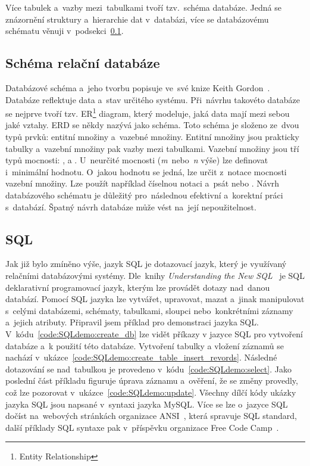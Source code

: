 Více tabulek a~vazby mezi~tabulkami tvoří tzv.~schéma databáze. Jedná se znázornění struktury a~hierarchie dat
v~databázi, více se databázovému schématu věnuji v~podsekci~\ref{subsection:schema_relacni_databaze}.

\subsection{Schéma relační databáze}
\label{subsection:schema_relacni_databaze}
Databázové schéma a~jeho tvorbu  popisuje ve~své knize Keith Gordon~\cite{ModellingBusinessInformationEntityRelationship}.
Databáze reflektuje data a~stav určitého systému. Při~návrhu takovéto databáze se nejprve tvoří tzv. ER\footnote{Entity Relationship} diagram, který modeluje, jaká data mají mezi sebou jaké vztahy. ERD se někdy nazývá
jako schéma. Toto schéma je složeno ze~dvou typů prvků: entitní množiny a~vazebné množiny. Entitní množiny jsou
prakticky tabulky a~vazební množiny pak vazby mezi tabulkami.
Vazební množiny jsou tří typů mocnosti: ,  a .
U~neurčité mocnosti (\textit{m}~nebo~\textit{n} výše) lze definovat i~minimální hodnotu. O~jakou hodnotu se jedná,
lze určit z~notace mocnosti vazební množiny. Lze použít například číselnou notaci a~psát  nebo .
Návrh databázového schématu je důležitý pro~následnou efektivní a~korektní práci s~databází. Špatný návrh databáze může vést na~její nepoužitelnost.

\subsection{SQL}
\label{subsection:sql}
Jak již bylo zmíněno výše, jazyk SQL je dotazovací jazyk, který je využívaný relačními databázovými systémy.
Dle~knihy \textit{Understanding the New SQL}~\cite{UnderstandingTheNewSQL} je SQL deklarativní programovací jazyk,
kterým lze provádět dotazy nad~danou databází. Pomocí SQL jazyka lze vytvářet, upravovat, mazat a~jinak manipulovat s~celými databázemi, schématy, tabulkami, sloupci nebo~konkrétními záznamy a~jejich atributy. Připravil jsem příklad pro demonstraci jazyka SQL. V~kódu~\ref{code:SQLdemo:create_db} lze vidět příkazy v jazyce SQL pro vytvoření databáze a~k použití této databáze. Vytvoření tabulky a vložení záznamů se nachází v~ukázce~\ref{code:SQLdemo:create_table_insert_revords}. Následné dotazování se nad~tabulkou je provedeno v~kódu~\ref{code:SQLdemo:select}. Jako poslední část příkladu figuruje úprava záznamu a~ověření, že se změny provedly, což lze pozorovat
v~ukázce~\ref{code:SQLdemo:update}. Všechny dílčí kódy ukázky jazyka SQL jsou napsané v~syntaxi jazyka MySQL.
Více se lze o~jazyce SQL dočíst na~webových stránkách organizace ANSI~\cite{ANSISQLWebpage}, která spravuje SQL standard, další příklady SQL syntaxe pak v~příspěvku organizace Free Code Camp~\cite{FreecodecampSQL}.


